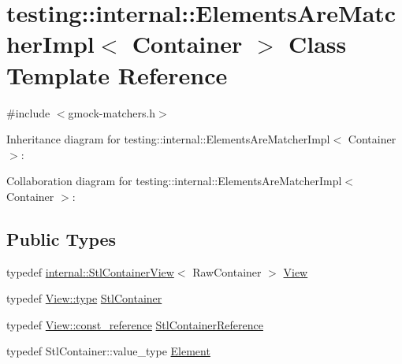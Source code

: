\hypertarget{classtesting_1_1internal_1_1_elements_are_matcher_impl}{}\section{testing\+:\+:internal\+:\+:Elements\+Are\+Matcher\+Impl$<$ Container $>$ Class Template Reference}
\label{classtesting_1_1internal_1_1_elements_are_matcher_impl}


{\ttfamily \#include $<$gmock-\/matchers.\+h$>$}



Inheritance diagram for testing\+:\+:internal\+:\+:Elements\+Are\+Matcher\+Impl$<$ Container $>$\+:


Collaboration diagram for testing\+:\+:internal\+:\+:Elements\+Are\+Matcher\+Impl$<$ Container $>$\+:
\subsection*{Public Types}
\begin{DoxyCompactItemize}
\item 
typedef \hyperlink{classtesting_1_1internal_1_1_stl_container_view}{internal\+::\+Stl\+Container\+View}$<$ Raw\+Container $>$ \hyperlink{classtesting_1_1internal_1_1_elements_are_matcher_impl_a68c37c6cc56c047323543044445a5022}{View}
\item 
typedef \hyperlink{classtesting_1_1internal_1_1_stl_container_view_a2b2c63a6dcdbfe63fb0ee121ebf463ba}{View\+::type} \hyperlink{classtesting_1_1internal_1_1_elements_are_matcher_impl_a5897abb9a1dcf88afe04e14986ebe46f}{Stl\+Container}
\item 
typedef \hyperlink{classtesting_1_1internal_1_1_stl_container_view_a9cd4f6ed689b3938cdb7b3c4cbf1b36b}{View\+::const\+\_\+reference} \hyperlink{classtesting_1_1internal_1_1_elements_are_matcher_impl_ad5d20c1aa6e8c06c82fe3ac4d68c2278}{Stl\+Container\+Reference}
\item 
typedef Stl\+Container\+::value\+\_\+type \hyperlink{classtesting_1_1internal_1_1_elements_are_matcher_impl_ab2ae88256ac950b69cd2af67b9820c87}{Element}
\end{DoxyCompactItemize}
